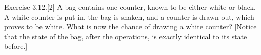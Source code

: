 \item
  Exercise 3.12.[2] A bag contains one counter, known to be either white or
  black. A white counter is put in, the bag is shaken, and a counter
  is drawn out, which proves to be white. What is now the chance of
  drawing a white counter? [Notice that the state of the bag, after the
  operations, is exactly identical to its state before.]
